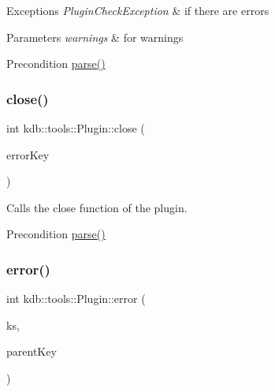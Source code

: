\begin{DoxyExceptions}{Exceptions}
{\em Plugin\+Check\+Exception} & if there are errors \\
\hline
\end{DoxyExceptions}

\begin{DoxyParams}{Parameters}
{\em warnings} & for warnings\\
\hline
\end{DoxyParams}
\begin{DoxyPrecond}{Precondition}
\hyperlink{classkdb_1_1tools_1_1Plugin_adfcba2fbdeb436a1083410df804d5fb0}{parse()} 
\end{DoxyPrecond}
\mbox{\label{classkdb_1_1tools_1_1Plugin_a40b5fd413f3f6da735680ed8d7c8a6a2}} 
\subsubsection{\texorpdfstring{close()}{close()}}
{\footnotesize\ttfamily int kdb\+::tools\+::\+Plugin\+::close (\begin{DoxyParamCaption}\item[{\hyperlink{classkdb_1_1Key}{kdb\+::\+Key} \&}]{error\+Key }\end{DoxyParamCaption})}



Calls the close function of the plugin. 

\begin{DoxyPrecond}{Precondition}
\hyperlink{classkdb_1_1tools_1_1Plugin_adfcba2fbdeb436a1083410df804d5fb0}{parse()} 
\end{DoxyPrecond}
\mbox{\label{classkdb_1_1tools_1_1Plugin_a8ec348b49a34ef17fda64cb289b8cf64}} 
\subsubsection{\texorpdfstring{error()}{error()}}
{\footnotesize\ttfamily int kdb\+::tools\+::\+Plugin\+::error (\begin{DoxyParamCaption}\item[{\hyperlink{classkdb_1_1KeySet}{kdb\+::\+Key\+Set} \&}]{ks,  }\item[{\hyperlink{classkdb_1_1Key}{kdb\+::\+Key} \&}]{parent\+Key }\end{DoxyParamCaption})}




